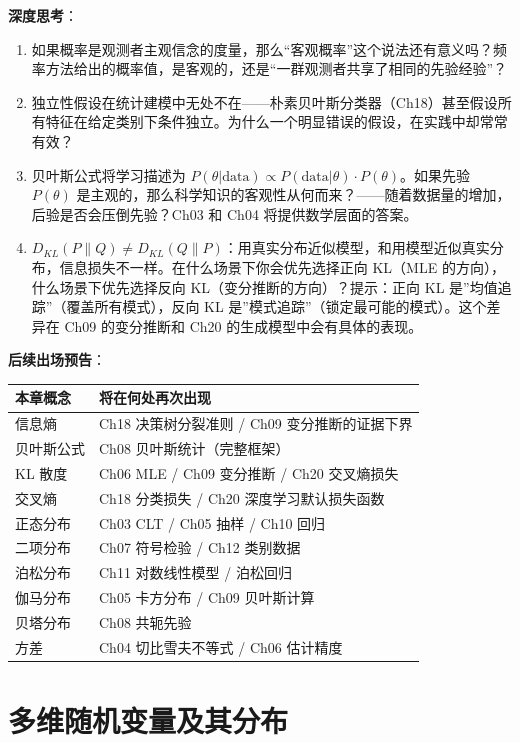 \documentclass[
]{book}
\begin{document}
\textbf{深度思考}：

\begin{enumerate}
\def\labelenumi{\arabic{enumi}.}
\item
  如果概率是观测者主观信念的度量，那么``客观概率''这个说法还有意义吗？频率方法给出的概率值，是客观的，还是``一群观测者共享了相同的先验经验''？
\item
  独立性假设在统计建模中无处不在------朴素贝叶斯分类器（Ch18）甚至假设所有特征在给定类别下条件独立。为什么一个明显错误的假设，在实践中却常常有效？
\item
  贝叶斯公式将学习描述为 \(P(\theta|\text{data}) \propto P(\text{data}|\theta) \cdot P(\theta)\)。如果先验 \(P(\theta)\) 是主观的，那么科学知识的客观性从何而来？------随着数据量的增加，后验是否会压倒先验？Ch03 和 Ch04 将提供数学层面的答案。
\item
  \(D_{KL}(P \parallel Q) \neq D_{KL}(Q \parallel P)\)：用真实分布近似模型，和用模型近似真实分布，信息损失不一样。在什么场景下你会优先选择正向 KL（MLE 的方向），什么场景下优先选择反向 KL（变分推断的方向）？提示：正向 KL 是''均值追踪''（覆盖所有模式），反向 KL 是''模式追踪''（锁定最可能的模式）。这个差异在 Ch09 的变分推断和 Ch20 的生成模型中会有具体的表现。
\end{enumerate}

\textbf{后续出场预告}：

\begin{longtable}[]{@{}ll@{}}
\toprule\noalign{}
本章概念 & 将在何处再次出现 \\
\midrule\noalign{}
\endhead
\bottomrule\noalign{}
\endlastfoot
信息熵 & Ch18 决策树分裂准则 / Ch09 变分推断的证据下界 \\
贝叶斯公式 & Ch08 贝叶斯统计（完整框架） \\
KL 散度 & Ch06 MLE / Ch09 变分推断 / Ch20 交叉熵损失 \\
交叉熵 & Ch18 分类损失 / Ch20 深度学习默认损失函数 \\
正态分布 & Ch03 CLT / Ch05 抽样 / Ch10 回归 \\
二项分布 & Ch07 符号检验 / Ch12 类别数据 \\
泊松分布 & Ch11 对数线性模型 / 泊松回归 \\
伽马分布 & Ch05 卡方分布 / Ch09 贝叶斯计算 \\
贝塔分布 & Ch08 共轭先验 \\
方差 & Ch04 切比雪夫不等式 / Ch06 估计精度 \\
\end{longtable}

\chapter{多维随机变量及其分布}\label{ux591aux7ef4ux968fux673aux53d8ux91cfux53caux5176ux5206ux5e03}
\end{document}
